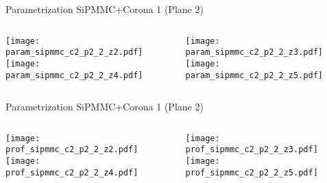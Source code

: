 \documentclass{beamer}
\begin{document}
\begin{frame}{Parametrization SiPMMC+Corona 1 (Plane 2)}
	\begin{columns}[onlytextwidth]
		\begin{column}{0.5\textwidth}
			\texttt{[image: param\_sipmmc\_c2\_p2\_2\_z2.pdf]} \\
			\texttt{[image: param\_sipmmc\_c2\_p2\_2\_z4.pdf]}
		 \end{column}
		 \begin{column}{0.5\textwidth}
			\texttt{[image: param\_sipmmc\_c2\_p2\_2\_z3.pdf]} \\
			\texttt{[image: param\_sipmmc\_c2\_p2\_2\_z5.pdf]}
		 \end{column}
 \end{columns}
\end{frame}

\begin{frame}{Parametrization SiPMMC+Corona 1 (Plane 2)}
	\begin{columns}[onlytextwidth]
		\begin{column}{0.5\textwidth}
			\texttt{[image: prof\_sipmmc\_c2\_p2\_2\_z2.pdf]} \\
			\texttt{[image: prof\_sipmmc\_c2\_p2\_2\_z4.pdf]}
		 \end{column}
		 \begin{column}{0.5\textwidth}
			\texttt{[image: prof\_sipmmc\_c2\_p2\_2\_z3.pdf]} \\
			\texttt{[image: prof\_sipmmc\_c2\_p2\_2\_z5.pdf]}
		 \end{column}
 \end{columns}
\end{frame}

 
\end{document}
